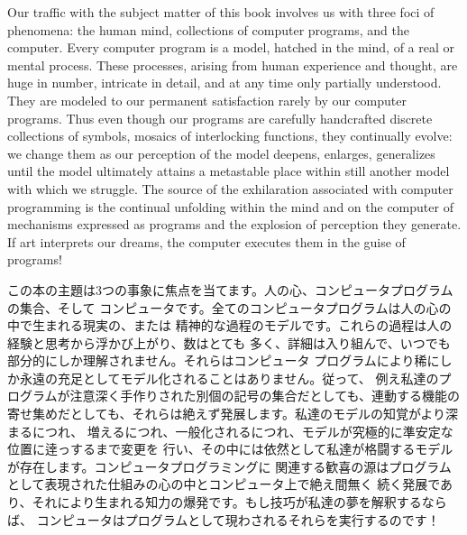 \documentclass[oneside]{book}
\begin{document}
Our traffic with the subject matter of this book involves us with three foci of
phenomena: the human mind, collections of computer programs, and the computer.
Every computer program is a model, hatched in the mind, of a real or mental
process.  These processes, arising from human experience and thought, are huge
in number, intricate in detail, and at any time only partially understood.
They are modeled to our permanent satisfaction rarely by our computer programs.
Thus even though our programs are carefully handcrafted discrete collections of
symbols, mosaics of interlocking functions, they continually evolve: we change
them as our perception of the model deepens, enlarges, generalizes until the
model ultimately attains a metastable place within still another model with
which we struggle.  The source of the exhilaration associated with computer
programming is the continual unfolding within the mind and on the computer of
mechanisms expressed as programs and the explosion of perception they generate.
If art interprets our dreams, the computer executes them in the guise of
programs!

この本の主題は3つの事象に焦点を当てます。人の心、コンピュータプログラムの集合、そして
コンピュータです。全てのコンピュータプログラムは人の心の中で生まれる現実の、または
精神的な過程のモデルです。これらの過程は人の経験と思考から浮かび上がり、数はとても
多く、詳細は入り組んで、いつでも部分的にしか理解されません。それらはコンピュータ
プログラムにより稀にしか永遠の充足としてモデル化されることはありません。従って、
例え私達のプログラムが注意深く手作りされた別個の記号の集合だとしても、連動する機能の
寄せ集めだとしても、それらは絶えず発展します。私達のモデルの知覚がより深まるにつれ、
増えるにつれ、一般化されるにつれ、モデルが究極的に準安定な位置に逹っするまで変更を
行い、その中には依然として私達が格闘するモデルが存在します。コンピュータプログラミングに
関連する歓喜の源はプログラムとして表現された仕組みの心の中とコンピュータ上で絶え間無く
続く発展であり、それにより生まれる知力の爆発です。もし技巧が私達の夢を解釈するならば、
コンピュータはプログラムとして現わされるそれらを実行するのです！
\end{document}
